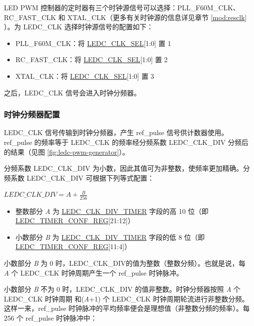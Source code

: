 \documentclass[main\_\_CN.tex]{subfiles}
\begin{document}
LED PWM 控制器的定时器有三个时钟源信号可以选择：PLL\_F60M\_CLK、RC\_FAST\_CLK 和 XTAL\_CLK（更多有关时钟源的信息详见章节 \ref{mod:resclk} \textit{}）。为 LEDC\_CLK 选择时钟源信号的配置如下：

\begin{itemize}
    \item PLL\_F60M\_CLK：将 \hyperref[fielddesc:LEDCCLKSEL]{LEDC\_CLK\_SEL}[1:0] 置 1
    \item RC\_FAST\_CLK：将 \hyperref[fielddesc:LEDCCLKSEL]{LEDC\_CLK\_SEL}[1:0] 置 2
    \item XTAL\_CLK：将 \hyperref[fielddesc:LEDCCLKSEL]{LEDC\_CLK\_SEL}[1:0] 置 3
\end{itemize}



之后，LEDC\_CLK 信号会进入时钟分频器。

\subsubsection{时钟分频器配置}
LEDC\_CLK 信号传输到时钟分频器，产生 ref\_pulse 信号供计数器使用。ref\_pulse 的频率等于 LEDC\_CLK 的频率经分频系数 LEDC\_CLK\_DIV 分频后的结果（见图 \ref{fig:ledc-pwm-generator}）。

分频系数 LEDC\_CLK\_DIV 为小数，因此其值可为非整数，使频率更加精确。分频系数 LEDC\_CLK\_DIV 可根据下列等式配置：

\begin{center}
$LEDC\_CLK\_DIV= A + \frac{B}{256}$
\end{center}

\begin{itemize}
    \item 整数部分 \textit{A} 为 \hyperref[fielddesc:LEDCCLKDIVTIMERX]{LEDC\_CLK\_DIV\_TIMER} 字段的高 10 位（即 \hyperref[regdesc:LEDCTIMERXCONFREG]{LEDC\_TIMER\_CONF\_REG}[21:12]）
    \item 小数部分 \textit{B} 为 \hyperref[fielddesc:LEDCCLKDIVTIMERX]{LEDC\_CLK\_DIV\_TIMER} 字段的低 8 位（即 \hyperref[regdesc:LEDCTIMERXCONFREG]{LEDC\_TIMER\_CONF\_REG}[11:4]）
\end{itemize}

小数部分 \textit{B} 为 0 时，LEDC\_CLK\_DIV的值为整数（整数分频）。也就是说，每 \textit{A} 个 LEDC\_CLK 时钟周期产生一个 ref\_pulse 时钟脉冲。

小数部分 \textit{B} 不为 0 时，LEDC\_CLK\_DIV 的值非整数。时钟分频器按照 \textit{A} 个 LEDC\_CLK 时钟周期 和(\textit{A}+1) 个 LEDC\_CLK 时钟周期轮流进行非整数分频。这样一来，ref\_pulse 时钟脉冲的平均频率便会是理想值（非整数分频的频率）。每 256 个 ref\_pulse 时钟脉冲中：
\end{document}
